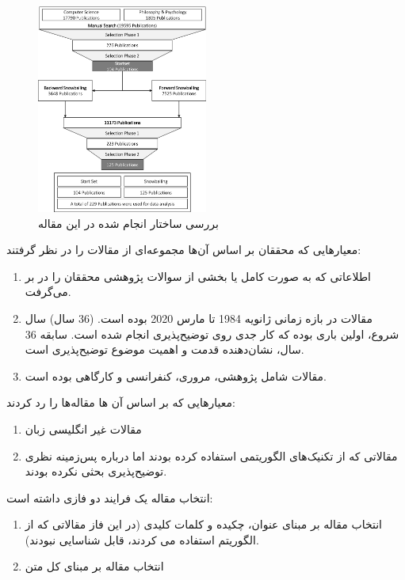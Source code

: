 \begin{figure}[H]
    \centering
    \includegraphics[width=0.5\textwidth]{images/slr_order.png}
    \caption{بررسی ساختار  انجام شده در این مقاله}
    \label{fig:slrOrder}
\end{figure}

معیارهایی که محققان بر اساس آن‌ها مجموعه‌ای از مقالات را در نظر گرفتند:

\begin{enumerate}
    \item اطلاعاتی که به صورت کامل یا بخشی از سوالات پژوهشی محققان را در بر می‌گرفت.
    \item مقالات در بازه زمانی ژانویه 1984 تا مارس 2020 بوده است. (36 سال) سال
    شروع، اولین باری بوده که کار جدی روی توضیح‌پذیری انجام شده است. سابقه 36
    سال، نشان‌دهنده قدمت و اهمیت موضوع توضیح‌پذیری است.
    \item مقالات شامل پژوهشی، مروری، کنفرانسی و کارگاهی بوده است.
\end{enumerate}

معیارهایی که بر اساس آن ها مقاله‌ها را رد کردند: 

\begin{enumerate}
    \item مقالات غیر انگلیسی زبان
    \item مقالاتی که از تکنیک‌های الگوریتمی استفاده کرده بودند اما درباره
    پس‌زمینه نظری توضیح‌پذیری بحثی نکرده بودند.
\end{enumerate}

انتخاب مقاله یک فرایند دو فازی داشته است:

\begin{enumerate}
    \item انتخاب مقاله بر مبنای عنوان، چکیده و کلمات کلیدی (در این فاز مقالاتی
    که از الگوریتم استفاده می کردند، قابل شناسایی نبودند).
    \item انتخاب مقاله بر مبنای کل متن
\end{enumerate}

